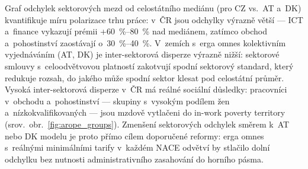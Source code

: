 Graf odchylek sektorových mezd od celostátního mediánu (pro CZ vs.~AT a~DK) kvantifikuje míru polarizace trhu práce: v~ČR jsou odchylky výrazně větší --- ICT a~finance vykazují prémii +\SIrange{60}{80}{\percent} nad mediánem, zatímco obchod a~pohostinství zaostávají o~\SIrange{30}{40}{\percent}.
V~zemích s~erga omnes kolektivním vyjednáváním (AT, DK) je inter-sektorová disperze výrazně nižší: sektorové smlouvy s~celoodvětvovou platností zakotvují spodní sektorový standard, který redukuje rozsah, do jakého může spodní sektor klesat pod celostátní průměr.
Vysoká inter-sektorová disperze v~ČR má reálné sociální důsledky: pracovníci v~obchodu a~pohostinství --- skupiny s~vysokým podílem žen a~nízkokvalifikovaných --- jsou mzdově vytlačeni do in-work poverty territory (srov.~obr.~\ref{fig:arope_groups}).
Zmenšení sektorových odchylek směrem k~AT nebo DK modelu je proto přímo cílem doporučené reformy: erga omnes s~reálnými minimálními tarify v~každém \ac{NACE} odvětví by stlačilo dolní odchylku bez nutnosti administrativního zasahování do horního pásma.


